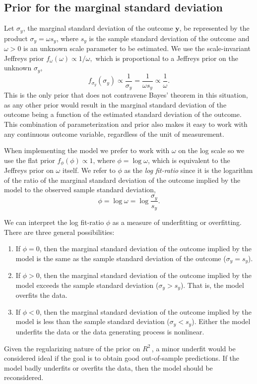 \documentclass[11pt]{article}
\newcommand{\Rsq}{$R^2\,$}
\newcommand{\y}{\mathbf{y}}
\begin{document}
\subsection{Prior for the marginal standard deviation}
\label{subsec:marginalSD}
Let $\sigma_y$, the marginal standard deviation of the outcome $\y$, be
represented by the product $\sigma_y = \omega s_y$, where $s_y$ is the sample
standard deviation of the outcome and $\omega > 0$ is an unknown scale parameter
to be estimated. We use the scale-invariant Jeffreys prior
$f_\omega \left(\omega\right) \propto 1 / \omega,$
which is proportional to a Jeffreys prior on the unknown $\sigma_y$,
$$f_{\sigma_y} \left(\sigma_y\right) \propto \frac{1}{\sigma_y}
= \frac{1}{\omega s_y} \propto \frac{1}{\omega}.$$
This is the only prior that does not contravene Bayes' theorem in this
situation, as any other prior would result in the marginal standard deviation of
the outcome being a function of the estimated standard deviation of the outcome.
This combination of parameterization and prior also makes it easy to work with
any continuous outcome variable, regardless of the unit of measurement.

When implementing the model we prefer to work with $\omega$ on the log scale
so we use the flat prior $f_\phi(\phi) \propto 1$, where $\phi =
\log{\omega}$, which is equivalent to the Jeffreys prior on $\omega$ itself. We
refer to $\phi$ as the \emph{log fit-ratio} since it is the logarithm of the
ratio of the marginal standard deviation of the outcome implied by the model to
the observed sample standard deviation,
%
$$\phi = \log{\omega} = \log{\frac{\sigma_y}{s_y}}.$$

We can interpret the log fit-ratio $\phi$ as a measure of underfitting or
overfitting. There are three general possibilities:

\begin{enumerate}
\item If $\phi = 0$, then the marginal standard deviation of
the outcome implied by the model is the same as the sample standard deviation of
the outcome  ($\sigma_y = s_y$).
\item If $\phi > 0$, then the marginal standard deviation of the outcome implied
by the model exceeds the sample standard deviation ($\sigma_y > s_y$). That is,
the model overfits the data.
\item If $\phi < 0$, then the marginal standard deviation of the outcome implied
by the model is less than the sample standard deviation  ($\sigma_y < s_y$).
Either the model underfits the data or the data generating process is nonlinear.
\end{enumerate}
%
Given the regularizing nature of the prior on \Rsq, a minor underfit would be
considered ideal if the goal is to obtain good out-of-sample predictions. If the
model badly underfits or overfits the data, then the model should be
reconsidered.
\end{document}
